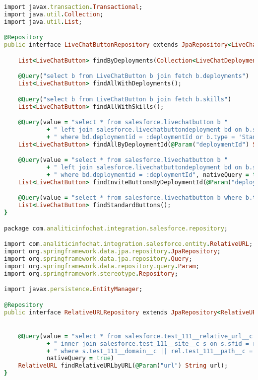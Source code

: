 \begin{lstlisting}[language=Ruby, style=rubystyle]
import javax.transaction.Transactional;
import java.util.Collection;
import java.util.List;

@Repository
public interface LiveChatButtonRepository extends JpaRepository<LiveChatButton, String> {

    List<LiveChatButton> findByDeployments(Collection<LiveChatDeployment> deployments);

    @Query("select b from LiveChatButton b join fetch b.deployments")
    List<LiveChatButton> findAllWithDeployments();

    @Query("select b from LiveChatButton b join fetch b.skills")
    List<LiveChatButton> findAllWithSkills();

    @Query(value = "select * from salesforce.livechatbutton b "
            + " left join salesforce.livechatbuttondeployment bd on b.sfid = bd.buttonid"
            + " where bd.deploymentid = :deploymentId or b.type = 'Standard'", nativeQuery = true)
    List<LiveChatButton> findAllByDeploymentId(@Param("deploymentId") String deploymentId);

    @Query(value = "select * from salesforce.livechatbutton b "
            + " left join salesforce.livechatbuttondeployment bd on b.sfid = bd.buttonid"
            + " where bd.deploymentid = :deploymentId", nativeQuery = true)
    List<LiveChatButton> findInviteButtonsByDeploymentId(@Param("deploymentId") String deploymentId);

    @Query(value = "select * from salesforce.livechatbutton b where b.type = 'Standard'", nativeQuery = true)
    List<LiveChatButton> findStandardButtons();
}

package com.analiticinfochat.integration.salesforce.repository;

import com.analiticinfochat.integration.salesforce.entity.RelativeURL;
import org.springframework.data.jpa.repository.JpaRepository;
import org.springframework.data.jpa.repository.Query;
import org.springframework.data.repository.query.Param;
import org.springframework.stereotype.Repository;

import javax.persistence.EntityManager;

@Repository
public interface RelativeURLRepository extends JpaRepository<RelativeURL, String> {


    @Query(value = "select * from salesforce.test_111__relative_url__c rel"
            + " inner join salesforce.test_111__site__c s on s.sfid = rel.test_111__site__c"
            + " where s.test_111__domain__c || rel.test_111__path__c = :url",
            nativeQuery = true)
    RelativeURL findRelativeURLbyURL(@Param("url") String url);
}


  \end{lstlisting}


